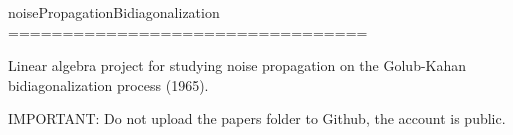 noisePropagationBidiagonalization
=================================

Linear algebra project for studying noise propagation on the Golub-Kahan bidiagonalization process (1965).

IMPORTANT: Do not upload the papers folder to Github, the account is public.
